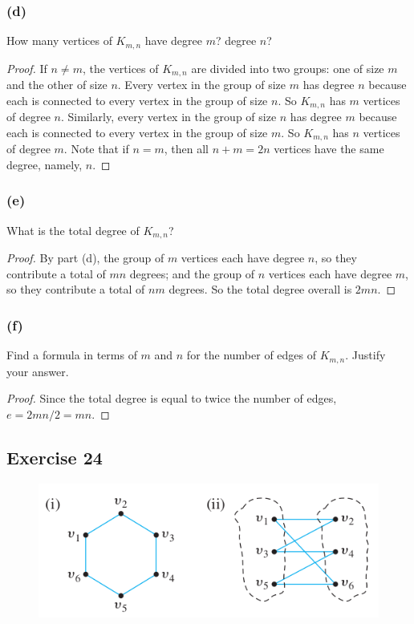 \documentclass[14pt]{extarticle}
\begin{document}
\subsubsection{(d)}
How many vertices of $K_{m,n}$ have degree $m$? degree $n$?

\begin{proof}
If $n \neq m$, the vertices of $K_{m,n}$ are divided into two groups: one of size $m$ and the other of size $n$. Every vertex in the group of size $m$ has degree $n$ because each is connected to every vertex in the group of size $n$. So $K_{m,n}$ has $m$ vertices of degree $n$. Similarly, every vertex in the group of size $n$ has degree $m$ because each is connected to every vertex in the group of size $m$. So $K_{m,n}$ has $n$ vertices of degree $m$. Note that if $n = m$, then all $n + m = 2n$ vertices have the same degree, namely, $n$.
\end{proof}

\subsubsection{(e)}
What is the total degree of $K_{m,n}$?

\begin{proof}
By part (d), the group of $m$ vertices each have degree $n$, so they contribute a total of $mn$ degrees; and the group of $n$ vertices each have degree $m$, so they contribute a total of $nm$ degrees. So the total degree overall is $2mn$.
\end{proof}

\subsubsection{(f)}
Find a formula in terms of $m$ and $n$ for the number of edges of $K_{m,n}$. Justify your answer.

\begin{proof}
Since the total degree is equal to twice the number of edges, $e = 2mn / 2 = mn$.
\end{proof}

\subsection{Exercise 24}
\begin{figure}[ht!]
\centering
\includegraphics[scale=0.5]{../images/4.9.24.1.png}
\end{figure}
\end{document}
